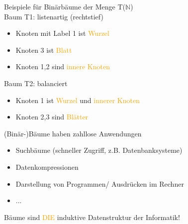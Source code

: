 \documentclass[paper=a4, fontsize=11pt]{scrartcl}
\numberwithin{equation}{section}
\numberwithin{figure}{section}
\numberwithin{table}{section}
\begin{document}
\begin{lstlistig}
Beispiele für Binärbäume der Menge T($\mathbb{N}$) \\
Baum T1: listenartig (rechtstief) \\
\begin{itemize}
\item Knoten mit Label 1 ist \textcolor{orange}{Wurzel}
\item Knoten 3 ist \textcolor{orange}{Blatt}
\item Knoten 1,2 sind \textcolor{orange}{innere Knoten}
\end{itemize}


Baum T2: balanciert \\
\begin{itemize}
\item Knoten 1 ist \textcolor{orange}{Wurzel} und \textcolor{orange}{innerer Knoten}
\item Knoten 2,3 sind \textcolor{orange}{Blätter}
\end{itemize}


(Binär-)Bäume haben zahllose Anwendungen \\
\begin{itemize}
\item Suchbäume (schneller Zugriff, z.B. Datenbanksysteme)
\item Datenkompressionen
\item Darstellung von Programmen/ Ausdrücken im  Rechner
\item ...
\end{itemize}

Bäume sind \textcolor{orange}{DIE} induktive Datenstruktur der Informatik! \\


\end{lstlistig}
\end{document}
